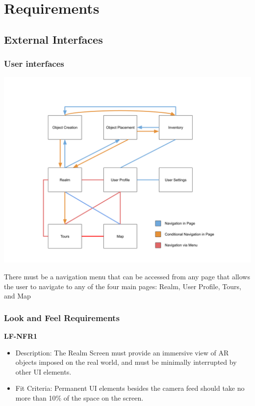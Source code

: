 \documentclass{article}
\begin{document}
\section{Requirements}


\subsection{External Interfaces}

\subsubsection{User interfaces}

\begin{center}
    \includegraphics[scale=0.4]{OtherDiagrams/ui_flow.png}
\end{center}

There must be a navigation menu that can be accessed from any page that allows the user to navigate to any of the four main pages: Realm, User Profile, Tours, and Map

\subsubsection{Look and Feel Requirements}

\textbf{LF-NFR1}

\begin{itemize}
    \item Description: The Realm Screen must provide an immersive view of AR objects imposed on the real world, and must be minimally interrupted by other UI elements. 
    \item Fit Criteria: Permanent UI elements besides the camera feed should take no more than 10\% of the space on the screen.
\end{itemize}
\end{document}
